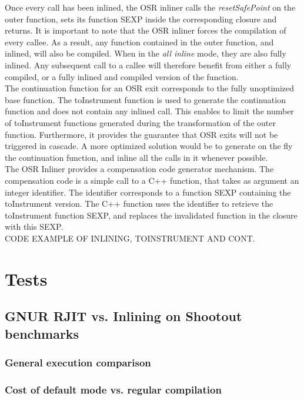 Once every call has been inlined, the OSR inliner calls the \textit{resetSafePoint} on the outer function, sets its function SEXP inside the corresponding closure and returns.
It is important to note that the OSR inliner forces the compilation of every callee. 
As a result, any function contained in the outer function, and inlined, will also be compiled. 
When in the \textit{all inline} mode, they are also fully inlined.
Any subsequent call to a callee will therefore benefit from either a fully compiled, or a fully inlined and compiled version of the function.\\

The continuation function for an OSR exit corresponds to the fully unoptimized base function. 
The toInstrument function is used to generate the continuation function and does not contain any inlined call.
This enables to limit the number of toInstrument functions generated during the transformation of the outer function.
Furthermore, it provides the guarantee that OSR exits will not be triggered in cascade.
A more optimized solution would be to generate on the fly the continuation function, and inline all the calls in it whenever possible.\\

The OSR Inliner provides a compensation code generator mechanism. 
The compensation code is a simple call to a C++ function, that takes as argument an integer identifier.
The identifier corresponds to a function SEXP containing the toInstrument version.
The C++ function uses the identifier to retrieve the toInstrument function SEXP, and replaces the invalidated function in the closure with this SEXP.\\

CODE EXAMPLE OF INLINING, TOINSTRUMENT AND CONT.\\

\section{Tests}
\subsection{GNUR RJIT vs. Inlining on Shootout benchmarks}

\subsubsection{General execution comparison}
\subsubsection{Cost of default mode vs. regular compilation}
